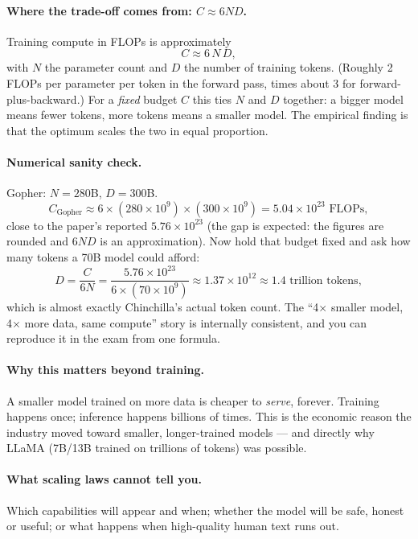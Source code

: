 \documentclass[11pt,a4paper]{article}
\begin{document}
\paragraph{Where the trade-off comes from: $C \approx 6ND$.} Training compute in FLOPs is
approximately
\[
C \approx 6\,N\,D,
\]
with $N$ the parameter count and $D$ the number of training tokens. (Roughly 2 FLOPs per
parameter per token in the forward pass, times about 3 for forward-plus-backward.) For a
\emph{fixed} budget $C$ this ties $N$ and $D$ together: a bigger model means fewer tokens, more
tokens means a smaller model. The empirical finding is that the optimum scales the two in equal
proportion.

\paragraph{Numerical sanity check.} Gopher: $N = 280$B, $D = 300$B.
\[
C_{\text{Gopher}} \approx 6 \times (280{\times}10^{9}) \times (300{\times}10^{9})
= 5.04 \times 10^{23} \text{ FLOPs},
\]
close to the paper's reported $5.76 \times 10^{23}$ (the gap is expected: the figures are
rounded and $6ND$ is an approximation). Now hold that budget fixed and ask how many tokens a
70B model could afford:
\[
D = \frac{C}{6N} = \frac{5.76 \times 10^{23}}{6 \times (70 \times 10^{9})}
\approx 1.37 \times 10^{12} \approx 1.4 \text{ trillion tokens},
\]
which is almost exactly Chinchilla's actual token count. The ``4$\times$ smaller model,
4$\times$ more data, same compute'' story is internally consistent, and you can reproduce it
in the exam from one formula.

\paragraph{Why this matters beyond training.} A smaller model trained on more data is cheaper
to \emph{serve}, forever. Training happens once; inference happens billions of times. This is
the economic reason the industry moved toward smaller, longer-trained models --- and directly
why LLaMA (7B/13B trained on trillions of tokens) was possible.

\paragraph{What scaling laws cannot tell you.} Which capabilities will appear and when;
whether the model will be safe, honest or useful; or what happens when high-quality human
text runs out.
\end{document}
